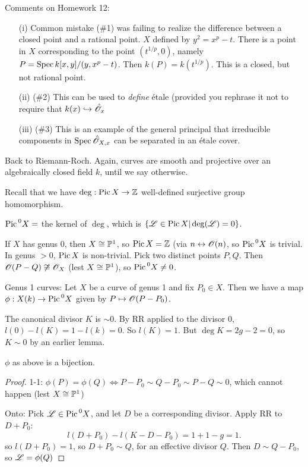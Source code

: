  \setcounter{lecture}{31}

 Comments on Homework 12:
 \begin{itemize}
 \item[(i)]Common mistake (\#1) was failing to realize the difference between a closed point and a rational point.  $X$
 defined by $y^2=x^p-t$.  There is a point in $X$ corresponding to
 the point $(t^{1/p},0)$, namely $P= \spec k[x,y]/(y,x^p-t)$. Then
 $k(P)=k(t^{1/p})$.  This is a closed, but not rational point.
 \item[(ii)] (\#2) This can be used to \emph{define} \'etale
 (provided you rephrase it not to require that
 $k(x)\hookrightarrow \hat \O_x$
 \item[(iii)](\#3) This is an example of the general principal
 that irreducible components in $\spec \hat \O_{X,x}$ can be
 separated in an \'etale cover.
 \end{itemize}

 Back to Riemann-Roch.  Again, curves are smooth and projective
 over an algebraically closed field $k$, until we say otherwise.

 Recall that we have $\deg:\pic X\to \Z$ well-defined surjective group
 homomorphism.

 \begin{definition}
 $\pic^0 X =$ the kernel of $\deg$, which is $\{\L\in \pic X|
 \deg(\L)=0\}$.
 \end{definition}
 If $X$ has genus 0, then $X\cong \P^1$, so $\pic X=\Z$ (via
 $n\leftrightarrow \O(n)$, so $\pic^0 X$ is trivial.  In genus
 $>0$, $\pic X$ is non-trivial.  Pick two distinct points $P,Q$.
 Then $\O(P-Q)\not\cong \O_X$ (lest $X\cong \P^1$), so $\pic^0
 X\not=0$.

 Genus 1 curves:  Let $X$ be a curve of genus 1 and fix $P_0\in
 X$.  Then we have a map $\phi:X(k)\to \pic^0 X$ given by
 $P\mapsto \O(P-P_0)$.

 \begin{remark}
   The canonical divisor $K$ is $\sim 0$.  By RR applied to the
   divisor 0, $l(0)-l(K)=1-l(k)=0$.  So $l(K)=1$.  But $\deg
   K=2g-2 =0$, so $K\sim 0$ by an earlier lemma.
 \end{remark}

 \begin{proposition}
   $\phi$ as above is a bijection.
 \end{proposition}
 \begin{proof}
 1-1: $\phi(P)=\phi(Q) \Leftrightarrow P-P_0\sim Q-P_0 \sim P-Q
 \sim 0$, which cannot happen (lest $X\cong \P^1$)

 Onto: Pick $\L\in \pic^0 X$, and let $D$ be a corresponding
 divisor.  Apply RR to $D+P_0$:
 \[
    l(D+P_0)-l(K-D-P_0) = 1+1-g =1.
 \]
 so $l(D+P_0)=1$, so $D+P_0\sim Q$, for an effective divisor $Q$.
 Then $D\sim Q-P_0$, so $\L=\phi(Q)$
 \end{proof}

